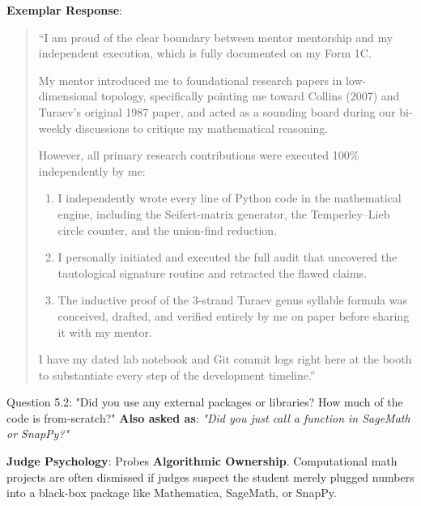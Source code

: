 \documentclass[11pt,letterpaper]{article}
\begin{document}
\begin{exemplarbox}
\textbf{Exemplar Response}:
\begin{quote}
``I am proud of the clear boundary between mentor mentorship and my independent execution, which is fully documented on my Form 1C.

My mentor introduced me to foundational research papers in low-dimensional topology, specifically pointing me toward Collins (2007) and Turaev's original 1987 paper, and acted as a sounding board during our bi-weekly discussions to critique my mathematical reasoning.

However, all primary research contributions were executed 100\% independently by me:
\begin{enumerate}
    \item I independently wrote every line of Python code in the mathematical engine, including the Seifert-matrix generator, the Temperley--Lieb circle counter, and the union-find reduction.
    \item I personally initiated and executed the full audit that uncovered the tautological signature routine and retracted the flawed claims.
    \item The inductive proof of the 3-strand Turaev genus syllable formula was conceived, drafted, and verified entirely by me on paper before sharing it with my mentor.
\end{enumerate}
I have my dated lab notebook and Git commit logs right here at the booth to substantiate every step of the development timeline.''
\end{quote}
\end{exemplarbox}

\vspace{1em}

\begin{questionbox}{Question 5.2: "Did you use any external packages or libraries? How much of the code is from-scratch?"}
\textbf{Also asked as}: \textit{"Did you just call a function in SageMath or SnapPy?"}
\end{questionbox}

\begin{strategybox}
\textbf{Judge Psychology}: Probes \textbf{Algorithmic Ownership}. Computational math projects are often dismissed if judges suspect the student merely plugged numbers into a black-box package like Mathematica, SageMath, or SnapPy.
\end{strategybox}
\end{document}
